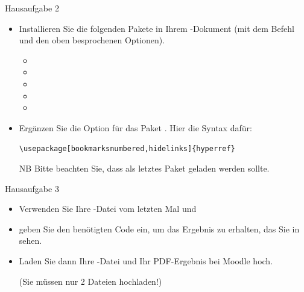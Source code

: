\begin{frame}[fragile]{Hausaufgabe 2}

\begin{itemize}
	
	\item Installieren Sie die folgenden Pakete in Ihrem -Dokument (mit dem Befehl  und den oben besprochenen Optionen).
	
	\begin{itemize}
		\item {}
		\item {}
		\item {}
		\item {}
		\item {}
	
	\end{itemize}
	
	\item Ergänzen Sie die Option  für das Paket . Hier die Syntax dafür:
		
		\lstinline|\usepackage[bookmarksnumbered,hidelinks]{hyperref}|
		
	\item[NB] Bitte beachten Sie, dass  als letztes Paket geladen werden sollte. 
\end{itemize}

\end{frame}


\begin{frame}{Hausaufgabe 3}

\begin{itemize}
	
	\item Verwenden Sie Ihre -Datei vom letzten Mal und
	
	\item geben Sie den benötigten Code ein, um das Ergebnis zu erhalten, das Sie in  sehen.
	
		
	\item Laden Sie dann Ihre -Datei und Ihr PDF-Ergebnis bei Moodle hoch. 
	
	(Sie müssen nur 2 Dateien hochladen!)
	
\end{itemize}

\end{frame}


